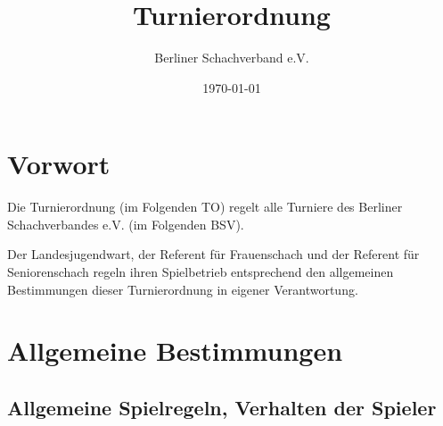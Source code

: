 \documentclass[fontsize=12pt, paper=a4, ngerman]{article}
\begin{document}
\author{ Berliner Schachverband e.V. } \title{Turnierordnung} \date{\today} \maketitle

\tableofcontents

\newpage

\section*{Vorwort}
Die Turnierordnung (im Folgenden TO) regelt alle Turniere des Berliner Schachverbandes e.V. (im Folgenden BSV).

Der Landesjugendwart, der Referent für Frauenschach und der Referent für Seniorenschach regeln ihren
Spielbetrieb entsprechend den allgemeinen Bestimmungen dieser Turnierordnung in eigener
Verantwortung.

\section{Allgemeine Bestimmungen}

\subsection{Allgemeine Spielregeln, Verhalten der Spieler}
\end{document}

